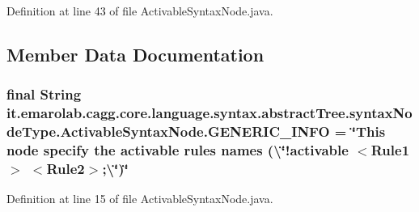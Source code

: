 Definition at line 43 of file Activable\-Syntax\-Node.\-java.



\subsection{Member Data Documentation}
\hypertarget{classit_1_1emarolab_1_1cagg_1_1core_1_1language_1_1syntax_1_1abstractTree_1_1syntaxNodeType_1_1ActivableSyntaxNode_a2f7713173ced6332056bee502c9f5be7}{
\subsubsection[{G\-E\-N\-E\-R\-I\-C\-\_\-\-I\-N\-F\-O}]{\setlength{\rightskip}{0pt plus 5cm}final String it.\-emarolab.\-cagg.\-core.\-language.\-syntax.\-abstract\-Tree.\-syntax\-Node\-Type.\-Activable\-Syntax\-Node.\-G\-E\-N\-E\-R\-I\-C\-\_\-\-I\-N\-F\-O = \char`\"{}This node specify the activable rules names (\textbackslash{}\char`\"{}!activable $<$Rule1$>$ $<$Rule2$>$;\textbackslash{}\char`\"{})\char`\"{}\hspace{0.3cm}{\ttfamily [static]}}}\label{classit_1_1emarolab_1_1cagg_1_1core_1_1language_1_1syntax_1_1abstractTree_1_1syntaxNodeType_1_1ActivableSyntaxNode_a2f7713173ced6332056bee502c9f5be7}


Definition at line 15 of file Activable\-Syntax\-Node.\-java.

